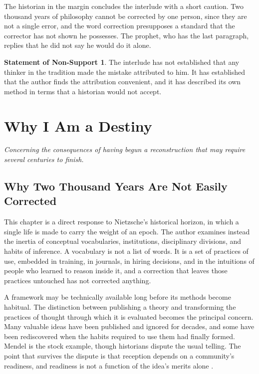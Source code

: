 \documentclass[11pt,openany,twoside]{book}
\theoremstyle{plain}
\theoremstyle{definition}
\newtheorem{nonsupport}{Statement of Non-Support}
\theoremstyle{remark}
\begin{document}
The historian in the margin concludes the interlude with a short caution. Two thousand years of philosophy cannot be corrected by one person, since they are not a single error, and the word correction presupposes a standard that the corrector has not shown he possesses. The prophet, who has the last paragraph, replies that he did not say he would do it alone.

\begin{nonsupport}
The interlude has not established that any thinker in the tradition made the mistake attributed to him. It has established that the author finds the attribution convenient, and it has described its own method in terms that a historian would not accept.
\end{nonsupport}

\part{Why I Am a Destiny}

\begin{center}\emph{Concerning the consequences of having begun a reconstruction that may require several centuries to finish.}\end{center}

\chapter{Why Two Thousand Years Are Not Easily Corrected}

This chapter is a direct response to Nietzsche's historical horizon, in which a single life is made to carry the weight of an epoch. The author examines instead the inertia of conceptual vocabularies, institutions, disciplinary divisions, and habits of inference. A vocabulary is not a list of words. It is a set of practices of use, embedded in training, in journals, in hiring decisions, and in the intuitions of people who learned to reason inside it, and a correction that leaves those practices untouched has not corrected anything.

A framework may be technically available long before its methods become habitual. The distinction between publishing a theory and transforming the practices of thought through which it is evaluated becomes the principal concern. Many valuable ideas have been published and ignored for decades, and some have been rediscovered when the habits required to use them had finally formed. Mendel is the stock example, though historians dispute the usual telling. The point that survives the dispute is that reception depends on a community's readiness, and readiness is not a function of the idea's merits alone \cite{kuhn-structure}.
\end{document}
